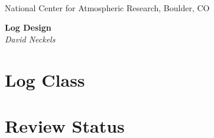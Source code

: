 \documentclass[]{article}
\begin{document}

\begin{titlepage}

\begin{latexonly}
 \\
\noindent National Center for Atmospheric Research, Boulder, CO \\
\vspace{2in}
\end{latexonly}

\begin{center}
{\Large\bf Log Design} \\
\medskip
{\it David Neckels}
\end{center}

\end{titlepage}

\tableofcontents

\newpage


\section{Log Class}









\section{Review Status}
\end{document}
